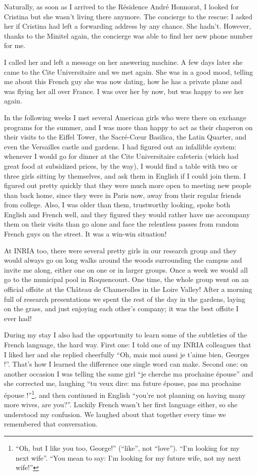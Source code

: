 \documentclass[12pt]{book}
\begin{document}
Naturally, as soon as I arrived to the Résidence André Honnorat, I
looked for Cristina but she wasn't living there anymore. The concierge
to the rescue: I asked her if Cristina had left a forwarding address by
any chance. She hadn't. However, thanks to the Minitel again, the
concierge was able to find her new phone number for me.

I called her and left a message on her answering machine. A few days
later she came to the Cite Universitaire and we met again. She was in a
good mood, telling me about this French guy she was now dating, how he
has a private plane and was flying her all over France. I was over her
by now, but was happy to see her again.

In the following weeks I met several American girls who were there on
exchange programs for the summer, and I was more than happy to act as
their chaperon on their visits to the Eiffel Tower, the Sacré-Cœur
Basilica, the Latin Quarter, and even the Versailles castle and gardens.
I had figured out an infallible system: whenever I would go for dinner
at the Cite Universitaire cafeteria (which had great food at subsidized
prices, by the way), I would find a table with two or three girls
sitting by themselves, and ask them in English if I could join them. I
figured out pretty quickly that they were much more open to meeting new
people than back home, since they were in Paris now, away from their
regular friends from college. Also, I was older than them, trustworthy
looking, spoke both English and French well, and they figured they would
rather have me accompany them on their visits than go alone and face the
relentless passes from random French guys on the street. It was a
win-win situation!

At INRIA too, there were several pretty girls in our research group and
they would always go on long walks around the woods surrounding the
campus and invite me along, either one on one or in larger groups. Once
a week we would all go to the municipal pool in Roquencourt. One time,
the whole group went on an official offsite at the Château de
Chamerolles in the Loire Valley! After a morning full of research
presentations we spent the rest of the day in the gardens, laying on the
grass, and just enjoying each other's company; it was the best offsite I
ever had!

During my stay I also had the opportunity to learn some of the
subtleties of the French language, the hard way. First one: I told one
of my INRIA colleagues that I liked her and she replied cheerfully ``Oh,
mais moi aussi je t'aime bien, Georges !''. That's how I learned the
difference one single word can make. Second one: on another occasion I
was telling the same girl ``je cherche ma prochaine épouse'' and she
corrected me, laughing ``tu veux dire: ma future épouse, pas ma
prochaine épouse !''\footnote{
  ``Oh, but I like you too, George!'' (``like'', not ``love''). ``I'm
  looking for my next wife''. ``You mean to say: I'm looking for my
  future wife, not my next wife!''}, and then continued in English
``you're not planning on having many more wives, are you?''. Luckily
French wasn't her first language either, so she understood my confusion.
We laughed about that together every time we remembered that
conversation.
\end{document}
